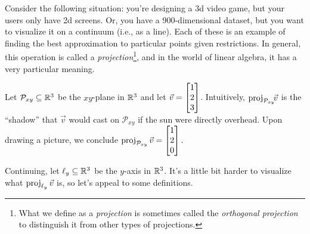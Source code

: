 Consider the following situation: you're designing a 3d video game, but your users only have 2d screens.
Or, you have a 900-dimensional dataset, but you want to visualize it on a continuum (i.e., as a line). 
Each of these is an example
of finding the best approximation to particular points given restrictions. In general, this operation
is called a \emph{projection}\footnote{ What we define as a \emph{projection} is sometimes
called the \emph{orthogonal projection} to distinguish it from other types of projections.}, 
and in the world of linear algebra, it has a very particular meaning.


Let $\mathcal{P}_{xy}\subseteq\mathbb{R}^3$ be the $xy$-plane in $\mathbb{R}^3$ and let $\vec v=\mat{1\\2\\3}$. Intuitively, 
$\operatorname{proj}_{\mathcal{P}_{xy}}\!\!\vec v$ is the ``shadow'' that  $\vec v$ would cast on ${\mathcal{P}_{xy}}$ if 
the sun were directly overhead.
Upon drawing a picture, we conclude $
	\Proj_{\mathcal{P}_{xy}}\vec v=\mat{1\\2\\0}.
$

\begin{center}
\end{center}

Continuing, let $\ell_y\subseteq \mathbb{R}^3$ be the $y$-axis in $\mathbb{R}^3$. It's a little bit harder to visualize what $\operatorname{proj}_{\ell_y}\vec v$
is, so let's appeal to some definitions.

